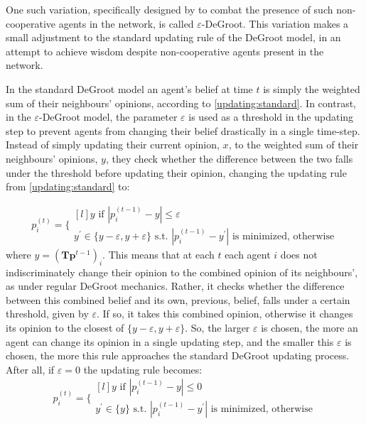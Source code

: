 \documentclass{article}
\newcommand{\beli}[3][2]{p_{#2}^{(#3)}}
\begin{document}
One such variation, specifically designed by \cite{amir2021robust} to combat the presence of such non-cooperative agents in the network, is called $\varepsilon$-DeGroot. This variation makes a small adjustment to the standard updating rule of the DeGroot model, in an attempt to achieve wisdom despite non-cooperative agents present in the network.

In the standard DeGroot model an agent's belief at time $t$ is simply the weighted sum of their neighbours' opinions, according to \ref{updating:standard}. In contrast, in the $\varepsilon$-DeGroot model, the parameter $\varepsilon$ is used as a threshold in the updating step to prevent agents from changing their belief drastically in a single time-step.
Instead of simply updating their current opinion, $x$, to the weighted sum of their neighbours' opinions, $y$, they check whether the difference between the two falls under the threshold before updating their opinion, changing the updating rule from \ref{updating:standard} to:

\begin{equation}
    \label{edegroot:updating}
  \beli{i}{t} =\Bigg\{
  \begin{matrix*}[l]
  y \text{ if } |\beli{i}{t-1} - y| \leq \varepsilon\\
  y^{\prime}\in\{y-\varepsilon, y+\varepsilon\}\text{ s.t. }|\beli{i}{t-1} - y^{\prime}|\text{ is minimized, otherwise}
  \end{matrix*}
\end{equation}
where $y = (\textbf{T}\textbf{p}^{t-1})_i$. This means that at each $t$ each agent $i$ does not indiscriminately change their opinion to the combined opinion of its neighbours', as under regular DeGroot mechanics. Rather, it checks whether the difference between this combined belief and its own, previous, belief, falls under a certain threshold, given by $\varepsilon$. If so, it takes this combined opinion, otherwise it changes its opinion to the closest of $\{y-\varepsilon, y+\varepsilon\}$. So, the larger $\varepsilon$ is chosen, the more an agent can change its opinion in a single updating step, and the smaller this $\varepsilon$ is chosen, the more this rule approaches the standard DeGroot updating process. After all, if $\varepsilon = 0$ the updating rule becomes:
\begin{equation*}
  \beli{i}{t} =\Bigg\{
  \begin{matrix*}[l]
  y \text{ if } |\beli{i}{t-1} - y| \leq 0\\
  y^{\prime}\in\{y\}\text{ s.t. }|\beli{i}{t-1} - y^{\prime}|\text{ is minimized, otherwise}
  \end{matrix*}
\end{equation*}
\end{document}
